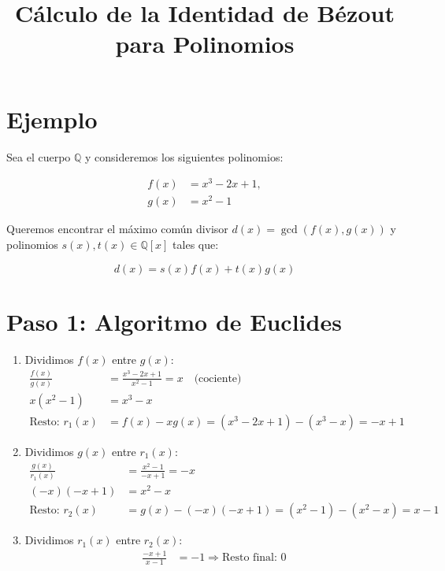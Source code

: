 \documentclass[12pt]{article}
\title{Cálculo de la Identidad de Bézout para Polinomios}
\author{}
\date{}
\begin{document}
\maketitle

\section*{Ejemplo}

Sea el cuerpo \( \mathbb{Q} \) y consideremos los siguientes polinomios:

\begin{align*}
  f(x) &= x^3 - 2x + 1, \\
  g(x) &= x^2 - 1
\end{align*}

Queremos encontrar el máximo común divisor \( d(x) = \gcd(f(x), g(x)) \) y polinomios \( s(x), t(x) \in \mathbb{Q}[x] \) tales que:

\[
  d(x) = s(x) f(x) + t(x) g(x)
\]

\section*{Paso 1: Algoritmo de Euclides}

\begin{enumerate}
  \item Dividimos \( f(x) \) entre \( g(x) \):
  \begin{align*}
    \frac{f(x)}{g(x)} &= \frac{x^3 - 2x + 1}{x^2 - 1} = x \quad \text{(cociente)} \\
    x(x^2 - 1) &= x^3 - x \\
    \text{Resto: } r_1(x) &= f(x) - xg(x) = (x^3 - 2x + 1) - (x^3 - x) = -x + 1
  \end{align*}

  \item Dividimos \( g(x) \) entre \( r_1(x) \):
  \begin{align*}
    \frac{g(x)}{r_1(x)} &= \frac{x^2 - 1}{-x + 1} = -x \\
    (-x)(-x + 1) &= x^2 - x \\
    \text{Resto: } r_2(x) &= g(x) - (-x)(-x + 1) = (x^2 - 1) - (x^2 - x) = x - 1
  \end{align*}

  \item Dividimos \( r_1(x) \) entre \( r_2(x) \):
  \begin{align*}
    \frac{-x + 1}{x - 1} &= -1 \Rightarrow \text{Resto final: } 0
  \end{align*}

\end{enumerate}
\end{document}

